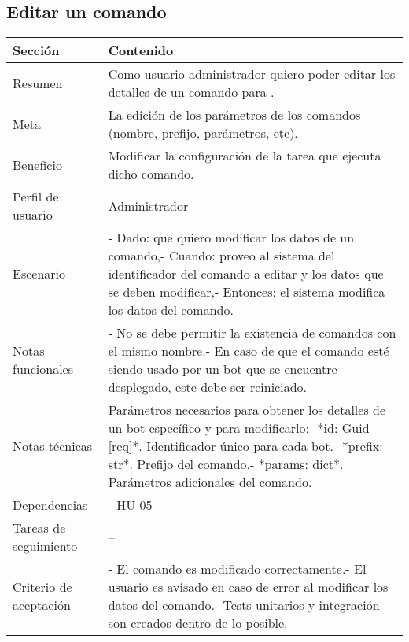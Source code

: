 \subsection{Editar un comando}

\begin{table}[H]
    \centering
    \begin{adjustbox}{max width=\textwidth}
    \begin{tabularx}{\textwidth}{|l|L|}
    \hline
        Sección & Contenido \\ \hline
        Resumen & Como usuario administrador quiero poder editar los detalles de un comando para . \\ \hline
        Meta & La edición de los parámetros de los comandos (nombre, prefijo, parámetros, etc). \\ \hline
        Beneficio & Modificar la configuración de la tarea que ejecuta dicho comando. \\ \hline
        Perfil de usuario & \hyperref[sec:personaAdmin]{Administrador} \\ \hline
        Escenario & - Dado: que quiero modificar los datos de un comando,\linebreak - Cuando: proveo al sistema del identificador del comando a editar y los datos que se deben modificar,\linebreak - Entonces: el sistema modifica los datos del comando. \\ \hline
        Notas funcionales & - No se debe permitir la existencia de comandos con el mismo nombre.\linebreak - En caso de que el comando esté siendo usado por un bot que se encuentre desplegado, este debe ser reiniciado. \\ \hline
        Notas técnicas & Parámetros necesarios para obtener los detalles de un bot específico y para modificarlo:\linebreak - *id: Guid [req]*. Identificador único para cada bot.\linebreak - *prefix: str*. Prefijo del comando.\linebreak - *params: dict*. Parámetros adicionales del comando. \\ \hline
        Dependencias & - HU-05 \\ \hline
        Tareas de seguimiento & – \\ \hline
        Criterio de aceptación & - El comando es modificado correctamente.\linebreak - El usuario es avisado en caso de error al modificar los datos del comando.\linebreak - Tests unitarios y integración son creados dentro de lo posible. \\ \hline
    \end{tabularx}
    \end{adjustbox}
\end{table}

